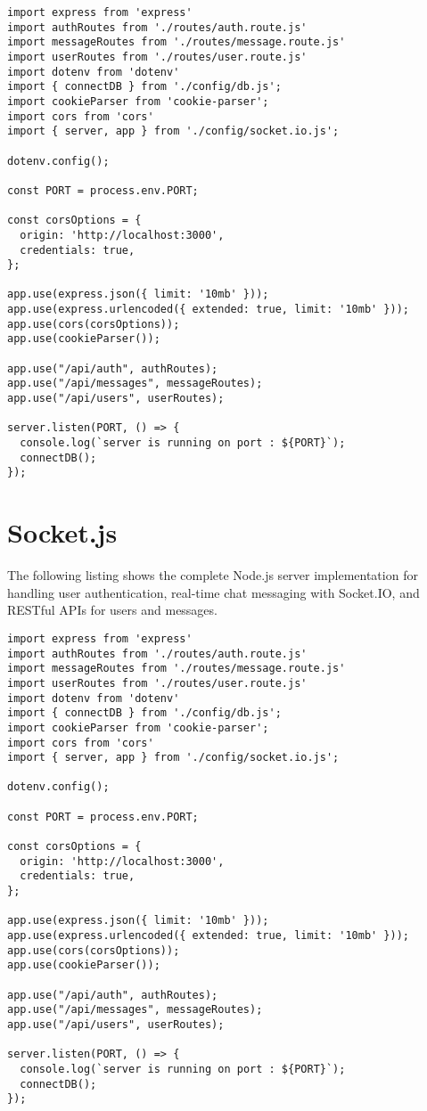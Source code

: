 \documentclass[12pt,a4paper]{report}
\begin{document}
\begin{lstlisting}
import express from 'express'
import authRoutes from './routes/auth.route.js'
import messageRoutes from './routes/message.route.js'
import userRoutes from './routes/user.route.js'
import dotenv from 'dotenv'
import { connectDB } from './config/db.js';
import cookieParser from 'cookie-parser';
import cors from 'cors'
import { server, app } from './config/socket.io.js';

dotenv.config();

const PORT = process.env.PORT;

const corsOptions = {
  origin: 'http://localhost:3000',  
  credentials: true,  
};

app.use(express.json({ limit: '10mb' }));
app.use(express.urlencoded({ extended: true, limit: '10mb' }));
app.use(cors(corsOptions));
app.use(cookieParser());

app.use("/api/auth", authRoutes);
app.use("/api/messages", messageRoutes);
app.use("/api/users", userRoutes);

server.listen(PORT, () => {
  console.log(`server is running on port : ${PORT}`);
  connectDB();
});
\end{lstlisting}

\section{Socket.js}

The following listing shows the complete Node.js server implementation for handling user authentication, real-time chat messaging with Socket.IO, and RESTful APIs for users and messages.


\begin{lstlisting}
import express from 'express'
import authRoutes from './routes/auth.route.js'
import messageRoutes from './routes/message.route.js'
import userRoutes from './routes/user.route.js'
import dotenv from 'dotenv'
import { connectDB } from './config/db.js';
import cookieParser from 'cookie-parser';
import cors from 'cors'
import { server, app } from './config/socket.io.js';

dotenv.config();

const PORT = process.env.PORT;

const corsOptions = {
  origin: 'http://localhost:3000',  
  credentials: true,  
};

app.use(express.json({ limit: '10mb' }));
app.use(express.urlencoded({ extended: true, limit: '10mb' }));
app.use(cors(corsOptions));
app.use(cookieParser());

app.use("/api/auth", authRoutes);
app.use("/api/messages", messageRoutes);
app.use("/api/users", userRoutes);

server.listen(PORT, () => {
  console.log(`server is running on port : ${PORT}`);
  connectDB();
});
\end{lstlisting}
\end{document}

